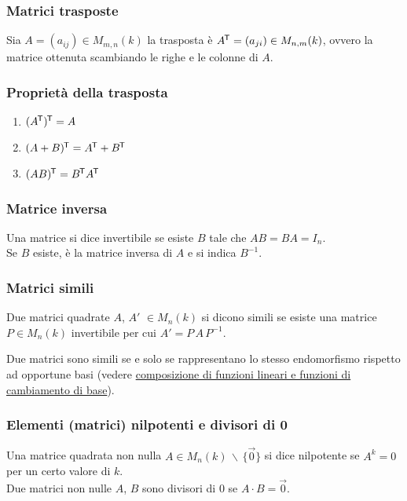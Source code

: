 \documentclass[a4paper]{article}
\newcommand\tran{^{\mkern-1.5mu\mathsf{T}}} %
\begin{document}
\subsubsection*{Matrici trasposte}
Sia \(A = (a_{ij}) \in M_{m,n}(k)\) la trasposta è \(A\tran = (a_{ji}) \in M_{n,m}(k)\), ovvero la matrice ottenuta scambiando le
righe e le colonne di \(A\).

\subsubsection*{Proprietà della trasposta}
\begin{enumerate}
	\item \((A\tran)\tran = A\)
	\item \((A+B)\tran = A\tran + B\tran\)
	\item \((AB)\tran = B\tran A\tran\)
\end{enumerate}

\subsubsection*{Matrice inversa}
Una matrice si dice invertibile se esiste \(B\) tale che \(AB = BA = I_n\). \\
Se \(B\) esiste, è la matrice inversa di \(A\) e si indica \(B^{-1}\).

\subsubsection*{Matrici simili}
Due matrici quadrate \(A\), \(A'\) \(\in M_n(k)\) si dicono simili se esiste una matrice \(P \in M_n(k)\) invertibile per cui
\(A' = P \, A \, P^{-1}\).

Due matrici sono simili se e solo se rappresentano lo stesso endomorfismo rispetto ad opportune basi (vedere
\hyperlink{composizioneFunzioniCambiamentiDiBase}{composizione di funzioni lineari e funzioni di cambiamento di base}).

\subsubsection*{Elementi (matrici) nilpotenti e divisori di 0}
Una matrice quadrata non nulla \(A \in M_n(k) \, \backslash \, \{ \vec{0} \}\) si dice nilpotente se \(A^k = 0\) per un certo valore di \(k\). \\
Due matrici non nulle \(A\), \(B\) sono divisori di \(0\) se \(A \cdot B = \vec{0}\).

\newpage
\end{document}
